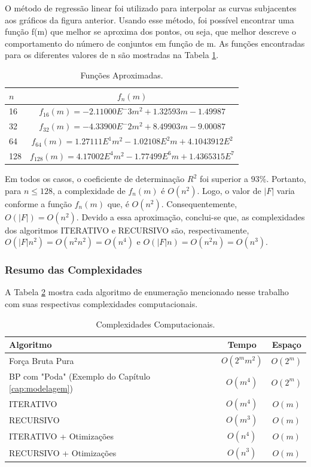 O método de regressão linear foi utilizado para interpolar as curvas subjacentes aos gráficos da figura anterior. Usando esse método, foi possível encontrar uma função  f(m) que melhor se aproxima dos pontos, ou seja, que melhor descreve o comportamento do número de conjuntos em função de m. As funções encontradas para os diferentes valores de n são mostradas na Tabela \ref{table:funcoes}.

\begin{table}[h]
\centering
\caption[Funções Aproximadas]
{Funções Aproximadas.}
\label{table:funcoes}
\begin{tabular}{lc}
\hline
$n$ & $f_n(m)$\\ \hline
16  & $f_{16}(m) = -2.11000E^-3m^2 + 1.32593m - 1.49987$\\
32  & $f_{32}(m) = -4.33900E^-2m^2 + 8.49903m - 9.00087$\\
64  & $f_{64}(m) =  1.27111E^1m^2  - 1.02108E^2m + 4.1043912E^2$\\
128 & $f_{128}(m) = 4.17002E^4m^2  - 1.77499E^6m + 1.4365315E^7$\\
\end{tabular}
\end{table}

Em todos os casos, o coeficiente de determinação $R^2$ foi superior a $93\%$. Portanto, para $n \leq 128$, a complexidade de $f_n(m)$ é $O(n^2)$. Logo, o valor de $|F|$ varia conforme a função $f_n(m)$ que, é $O(n^2)$. Consequentemente, $O(|F|)=O(n^2)$. Devido a essa aproximação, conclui-se que, as complexidades dos algoritmos ITERATIVO e RECURSIVO são, respectivamente, $O(|F|n^2) = O(n^2n^2) = O(n^4)$ e $O(|F|n) = O(n^2n) = O(n^3)$. 

\subsubsection{Resumo das Complexidades}

A Tabela \ref{table:complexidade} mostra cada algoritmo de enumeração mencionado nesse trabalho com suas respectivas complexidades computacionais.

\begin{table}[h]
\centering
\caption[Complexidades Computacionais]
{Complexidades Computacionais.}
\label{table:complexidade}
\begin{tabular}{lcc}
\hline
Algoritmo & Tempo & Espaço\\ \hline
Força Bruta Pura & $O(2^mm^2)$ & $O(2^m)$\\
BP com "Poda" (Exemplo do Capítulo \ref{cap:modelagem}) & $O(m^4)$ & $O(2^m)$\\
ITERATIVO & $O(m^4)$ & $O(m)$\\
RECURSIVO & $O(m^3)$ & $O(m)$\\
ITERATIVO + Otimizações & $O(n^4)$ & $O(m)$\\
RECURSIVO + Otimizações & $O(n^3)$ & $O(m)$\\
\end{tabular}
\end{table}

